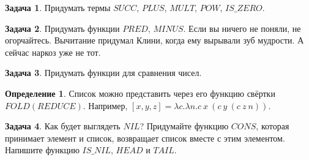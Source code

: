 \documentclass[10pt,twoside]{article}
\theoremstyle{plain}
\theoremstyle{definition}
\newtheorem{defi}{Определение}
\newtheorem{problem}{Задача}
\begin{document}
\begin{problem}
  Придумать термы $SUCC$, $PLUS$, $MULT$, $POW$, $IS\_ZERO$.
\begin{comment}
    $$SUCC = \lambda n.\lambda s.\lambda z.s\ (n\ s\ z)$$
    $$PLUS = \lambda n.\lambda m.\lambda s.\lambda z.n\ s\ (m\ s\ z)$$
    $$MULT = \lambda n.\lambda m.\lambda s.\lambda z.n\ (m\ s)\ z$$
    $$POW = \lambda n.\lambda m.\lambda s.\lambda z.m\ n\ s\ z$$
    $$IS\_ZERO = \lambda n. n\ (\lambda x.FALSE)\ TRUE$$
\end{comment}
\end{problem}

\begin{problem}
  Придумать функции $PRED$, $MINUS$.
  Если вы ничего не поняли, не огорчайтесь. Вычитание придумал Клини, когда ему вырывали зуб мудрости. А сейчас наркоз уже не тот.
\begin{comment}
    $$MINUS= \lambda n.\lambda m.m\ PRED n$$
    $$PRED = \lambda n.\lambda s.\lambda z.SND\ (n\ (\lambda p.PAIR\ (s\ (FST p))\ (FST p))\ (PAIR\ z\ z))$$
\end{comment}
\end{problem}

\begin{problem}
  Придумать функции для сравнения чисел.
\begin{comment}
    $$EQ = \lambda n.\lambda m.AND\ (IS\_ZERO\ (MINUS\ n\ m))\  (IS\_ZERO\ (MINUS\ m\ n))$$
    $$LEQ = \lambda n.\lambda m.(IS\_ZERO\ (MINUS\ n\ m))$$
    $$GEQ = \lambda n.\lambda m.(IS\_ZERO\ (MINUS\ m\ n))$$
    $$NEQ = \lambda n.\lambda m.NOT\ (AND\ (IS\_ZERO\ (MINUS\ n\ m))\  (IS\_ZERO\ (MINUS\ m\ n)))$$
\end{comment}
\end{problem}

\begin{defi}
  Список можно представить через его функцию свёртки $FOLD(REDUCE)$. Например, $[x,y,z] = \lambda c.\lambda n.c\ x\ (c\ y\ (c\ z\ n))$.
\end{defi}

\begin{problem}
  Как будет выглядеть $NIL$? Придумайте функцию $CONS$, которая принимает элемент и список, возвращает список вместе с этим элементом. Напишите функцию $IS\_NIL$, $HEAD$ и $TAIL$.
\begin{comment}
    $$NIL = \lambda c.\lambda n.n$$
    $$CONS = \lambda h.\lambda t.\lambda c.\lambda n.c\ h\ (t\ c\ n)$$
    $$IS\_NIL = \lambda l.l\ (\lambda h.\lambda t.FALSE)\ TRUE$$
    $$HEAD = \lambda l.l\ (\lambda h.\lambda t.h)\ NIL = \lambda l.l\ TRUE\ NIL$$
    $$TAIL = \lambda l.FST\ (l\ (\lambda x.\lambda p.PAIR\ (SND\ p)\ (CONS\ x\ (SND\ p)))\ (PAIR\ NIL\ NIL))$$
\end{comment}
\end{problem}
\end{document}
